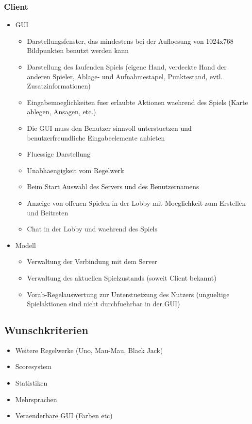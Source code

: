 \documentclass{article}
\begin{document}
\subsubsection{Client}
\begin{itemize}
	\item GUI
	\begin{itemize}
		\item Darstellungsfenster, das mindestens bei der Aufloesung von 1024x768 Bildpunkten benutzt werden kann
		\item Darstellung des laufenden Spiels (eigene Hand, verdeckte Hand der anderen Spieler, Ablage- und Aufnahmestapel, 			Punktestand, evtl. Zusatzinformationen)
		\item Eingabemoeglichkeiten fuer erlaubte Aktionen waehrend des Spiels (Karte ablegen, Ansagen, etc.)
		\item Die GUI muss den Benutzer sinnvoll unterstuetzen und benutzerfreundliche Eingabeelemente anbieten
		\item Fluessige Darstellung
		\item Unabhaengigkeit vom Regelwerk
		\item Beim Start Auswahl des Servers und des Benutzernamens
		\item Anzeige von offenen Spielen in der Lobby mit Moeglichkeit zum Erstellen und Beitreten
		\item Chat in der Lobby und waehrend des Spiels
	\end{itemize}
	\item Modell
	\begin{itemize}
		\item Verwaltung der Verbindung mit dem Server
		\item Verwaltung des aktuellen Spielzustands (soweit Client bekannt)
		\item Vorab-Regelauswertung zur Unterstuetzung des Nutzers (ungueltige Spielaktionen sind nicht durchfuehrbar in der 					GUI)
	\end{itemize}
\end{itemize}

\subsection{Wunschkriterien}
\begin{itemize}
	\item Weitere Regelwerke (Uno, Mau-Mau, Black Jack)
	\item Scoresystem
	\item Statistiken
	\item Mehrsprachen
	\item Veraenderbare GUI (Farben etc)
\end{itemize}
\end{document}
